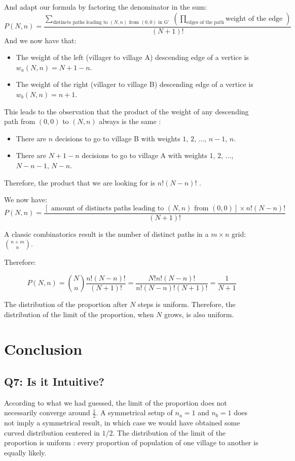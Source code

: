 \documentclass{beamer}
\begin{document}
And adapt our formula by factoring the denominator in the sum:
\[
    P(N,n)= \frac{\sum_{\text{distincts paths leading to } (N,n) \text{ from } (0,0) \text{ in G' }} ( \prod_{\text{edges of the path}}{\text{weight of the edge }})}{(N+1)!} 
\]
And we now have that:
\begin{itemize}
    \item The weight of the left (villager to village A) descending edge of a vertice is $w_a(N,n)=N+1-n$.
    \item The weight of the right (villager to village B) descending edge of a vertice is $w_b(N,n)=n+1$.
\end{itemize}
This leads to the observation that the product of the weight of any descending path from $(0,0)$ to $(N,n)$ always is the same :
\begin{itemize}
    \item There are $n$ decisions to go to village B with weights $1$, $2$, ..., $n-1$, $n$.
    \item There are $N+1-n$ decisions to go to village A with weights $1$, $2$, ..., $N-n-1$, $N-n$.
\end{itemize}
Therefore, the product that we are looking for is $n!(N-n)!$  .

We now have:
\[
    P(N,n)= \frac{\left[ \text{ amount of distincts paths leading to } (N,n) \text{ from } (0,0)   \right] \times  n!(N-n)!}{(N+1)!} 
\]

A classic combinatorics result is the number of distinct paths in a $m \times n$ grid: $\binom{n+m}{n}$.

Therefore:

\[
    P(N,n)= \binom{N}{n} \frac{ n!(N-n)!  }{(N+1)!} =   \frac{N!n!(N-n)!}{n!(N-n)!(N+1)!} = \frac{1}{N+1}
\]

The distribution of the proportion after $N$ steps is uniform. Therefore, the distribution of the limit of the proportion, when $N$ grows, is also uniform.



\section{Conclusion}

\subsection*{Q7: Is it Intuitive?}
\label{sub:q7_is_it_intuitive_}

According to what we had guessed, the limit of the proportion does not necessarily converge around $\frac{1}{2}$. A symmetrical setup of $n_a=1$ and $n_b=1$ does not imply a symmetrical result, in which case we would have obtained some curved distribution centered in $1/2$. The distribution of the limit of the proportion is uniform : every proportion of population of one village to another is equally likely.


\label{sec:cl}



\end{document}
